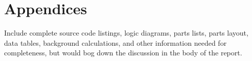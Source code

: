 \chapter{Appendices}
Include complete source code listings, logic diagrams, parts lists, parts layout, data tables, background calculations, and other information needed for completeness, but would bog down the discussion in the body of the report.
